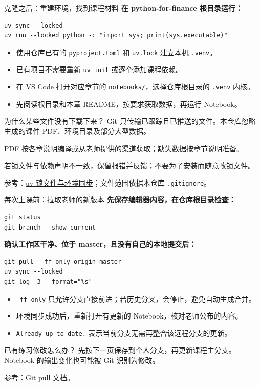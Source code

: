 \documentclass[9pt]{ctexbeamer}
\begin{document}
\begin{frame}[fragile]{克隆之后：重建环境，找到课程材料}
  \textbf{在 python-for-finance 根目录运行：}
\begin{lstlisting}[language={},numbers=none]
uv sync --locked
uv run --locked python -c "import sys; print(sys.executable)"
\end{lstlisting}
  \begin{itemize}
    \item 使用仓库已有的 \texttt{pyproject.toml} 和 \texttt{uv.lock} 建立本机 \texttt{.venv}。
    \item 已有项目不需要重新 \texttt{uv init} 或逐个添加课程依赖。
    \item 在 VS Code 打开对应章节的 \texttt{notebooks/}，选择仓库根目录的 \texttt{.venv} 内核。
    \item 先阅读根目录和本章 README，按要求获取数据，再运行 Notebook。
  \end{itemize}
  \begin{block}{为什么某些文件没有下载下来？}
    Git 只传输已跟踪且已推送的文件。本仓库忽略生成的课件 PDF、环境目录及部分大型数据。\par
    PDF 按各章说明编译或从老师提供的渠道获取；缺失数据按章节说明准备。
  \end{block}
  {\small 若锁文件与依赖声明不一致，保留报错并反馈；不要为了安装而随意改锁文件。}
  \par{\tiny 参考：\href{https://docs.astral.sh/uv/concepts/projects/sync/}{uv 锁文件与环境同步}；文件范围依据本仓库 \texttt{.gitignore}。}
\end{frame}

\begin{frame}[fragile]{每次上课前：拉取老师的新版本}
  \textbf{先保存编辑器内容，在仓库根目录检查：}
\begin{lstlisting}[language={},numbers=none]
git status
git branch --show-current
\end{lstlisting}
  \textbf{确认工作区干净、位于 master，且没有自己的本地提交后：}
\begin{lstlisting}[language={},numbers=none]
git pull --ff-only origin master
uv sync --locked
git log -3 --format="%s"
\end{lstlisting}
  \begin{itemize}
    \item \texttt{--ff-only} 只允许分支直接前进；若历史分叉，会停止，避免自动生成合并。
    \item 环境同步成功后，重新打开有更新的 Notebook，核对老师公布的内容。
    \item \texttt{Already up to date.} 表示当前分支无需再整合该远程分支的更新。
  \end{itemize}
  \begin{block}{已有练习修改怎么办？}
    先按下一页保存到个人分支，再更新课程主分支。Notebook 的输出变化也可能被 Git 识别为修改。
  \end{block}
  {\tiny 参考：\href{https://git-scm.com/docs/git-pull}{Git pull 文档}。}
\end{frame}
\end{document}

